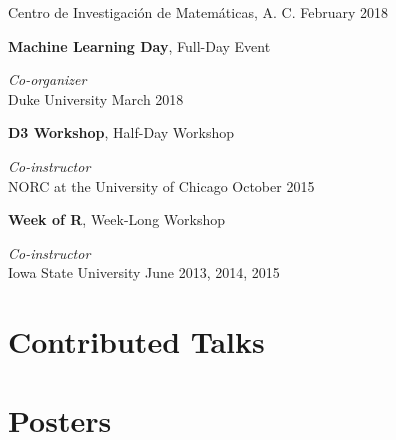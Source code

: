 \documentclass[margin,line]{res}
\begin{document}
\begin{resume}
\vspace{-.7cm}
Centro de Investigaci\'{o}n de Matem\'{a}ticas, A. C. \hfill February 2018



{\bf Machine Learning Day}, Full-Day Event

\vspace{-.4cm}
{\em Co-organizer} \hfill \\

\vspace{-.7cm}
Duke University \hfill March 2018


{\bf D3 Workshop}, Half-Day Workshop

\vspace{-.4cm}
{\em Co-instructor} \hfill \\

\vspace{-.7cm}
NORC at the University of Chicago \hfill October 2015


{\bf Week of R}, Week-Long Workshop

\vspace{-.4cm}
{\em Co-instructor} \hfill \\

\vspace{-.7cm}
Iowa State University \hfill June 2013, 2014, 2015



\section{\sc Contributed Talks}
\printbibliography[keyword=talk-contributed, heading=none, resetnumbers=true]

\section{\sc Posters}
\printbibliography[keyword=poster, heading=none, resetnumbers=true]


\end{resume}
\end{document}
